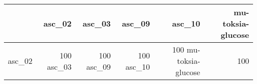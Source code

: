 \begin{tabular}{lrrrrr}
\toprule
 & asc_02 & asc_03 & asc_09 & asc_10 & mu-toksia-glucose \\
\midrule
asc_02 & 100%
asc_03 & 100%
asc_09 & 100%
asc_10 & 100%
mu-toksia-glucose & 100%
\bottomrule
\end{tabular}
